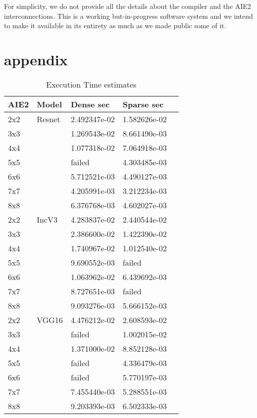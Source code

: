 \documentclass[conference]{IEEEtran}
\begin{document}
For simplicity, we do not provide all the details about the
compiler and the AIE2 interconnections. This is a working
but-in-progress software system and we intend to make it available in
its entirety as much as we made public some of it.
     
     
\section{appendix}



\begin{table}[htb]
  \caption{Execution Time estimates}
  \label{tab_perf}
\begin{center} 
\begin{tabular}{|l|l|l|l|l|}
  \hline
  AIE2 & Model  & Dense sec      & Sparse sec      \\ \hline\hline
  2x2   & Resnet & 2.492347e-02  & 1.582626e-02 \\ \hline
  3x3   &  & 1.269543e-02  & 8.661490e-03 \\ \hline
  4x4   &  &  1.077318e-02 & 7.064918e-03 \\ \hline
  5x5   &  &  failed       & 4.303485e-03 \\ \hline
  6x6   &  &  5.712521e-03 & 4.490127e-03 \\ \hline
  7x7   &  &  4.205991e-03 & 3.212234e-03 \\ \hline
  8x8   &  &  6.376768e-03 & 4.602027e-03 \\ \hline \hline
  2x2   & IncV3  & 4.283837e-02  & 2.440544e-02 \\ \hline
  3x3   &   & 2.386600e-02  & 1.422390e-02 \\ \hline
  4x4   &   &  1.740967e-02 & 1.012540e-02 \\ \hline
  5x5   &   &  9.690552e-03 & failed       \\ \hline
  6x6   &   &  1.063962e-02 & 6.439692e-03 \\ \hline
  7x7   &   &  8.727651e-03 & failed       \\ \hline
  8x8   &   &  9.093276e-03 & 5.666152e-03 \\ \hline \hline
  2x2   & VGG16  & 4.476212e-02  & 2.608593e-02 \\ \hline
  3x3   &   & failed        & 1.002015e-02 \\ \hline
  4x4   &   &  1.371000e-02 & 8.852128e-03 \\ \hline
  5x5   &   &  failed       & 4.336479e-03 \\ \hline
  6x6   &   &  failed       & 5.770197e-03 \\ \hline
  7x7   &   &  7.455440e-03 & 5.288551e-03 \\ \hline
  8x8   &   &  9.203393e-03 & 6.502333e-03 \\ \hline \hline
          
\end{tabular}
\end{center}
\end{table}
\end{document}

